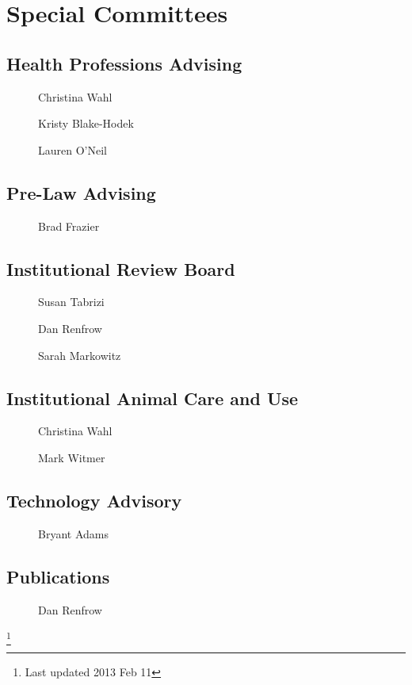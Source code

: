 \documentclass[10pt, twocolumn]{amsart}
\begin{document}
\section*{Special Committees}
\subsection*{Health Professions Advising} 
\begin{description}
\item[] Christina Wahl
\item[] Kristy Blake-Hodek
\item[] Lauren O'Neil
\end{description}

\subsection*{Pre-Law Advising} 
\begin{description}
\item[] Brad Frazier
\end{description}

\subsection*{Institutional Review Board} 
\begin{description}
\item[] Susan Tabrizi
\item[] Dan Renfrow
\item[] Sarah Markowitz
\end{description}

\subsection*{Institutional Animal Care and Use} 
\begin{description}
\item[] Christina Wahl
\item[] Mark Witmer
\end{description}

\subsection*{Technology Advisory} 
\begin{description}
\item[] Bryant Adams
\end{description}

\subsection*{Publications} 
\begin{description}
\item[] Dan Renfrow
\end{description}





\vfill
\footnote{Last updated 2013 Feb 11}
\end{document}
